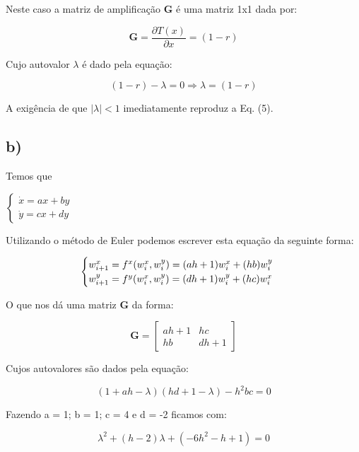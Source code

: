 \documentclass[a4wide]{report}
\begin{document}
Neste caso a matriz de amplificação $\textbf{G}$ é uma matriz 1x1 dada por: 

\begin{equation}
\textbf{G} = \frac{\partial T(x)}{\partial x} = (1-r)
\end{equation}

Cujo autovalor $\lambda$ é dado pela equação:

\begin{equation}
 (1-r) - \lambda = 0   \Rightarrow \lambda = (1-r)
\end{equation}

A exigência de que $|\lambda| < 1$ imediatamente reproduz a Eq. (5).

\subsection*{b)}

Temos que 

$\begin{cases} 
\dot{x} = ax + by \\ 
\dot{y} = cx + dy
\end{cases} $

Utilizando o método de Euler podemos escrever esta equação da seguinte forma:

\begin{equation}
\begin{cases} 
$$w^x_{i+1} = f^x(w^x_i,w^y_i) = (ah + 1)w^x_i +(hb)w^y_i \\ 
w^y_{i+1} = f^y(w^x_i,w^y_i) = (dh + 1)w^y_i +(hc)w^x_i $
$\end{cases}
\end{equation}

O que nos dá uma matriz $\textbf{G}$ da forma:

\[
\textbf{G}
=
\begin{bmatrix}
    ah + 1 & hc \\
    hb & dh + 1 
\end{bmatrix}
\]

Cujos autovalores são dados pela equação:

\begin{equation}
(1 + ah - \lambda)(hd + 1 -\lambda) - h^2bc = 0
\end{equation}

Fazendo a = 1; b = 1; c = 4 e d = -2 ficamos com:

\begin{equation}
\lambda^2 + (h-2)\lambda + ( -6h^2 -h + 1) = 0
\end{equation}
\end{document}
